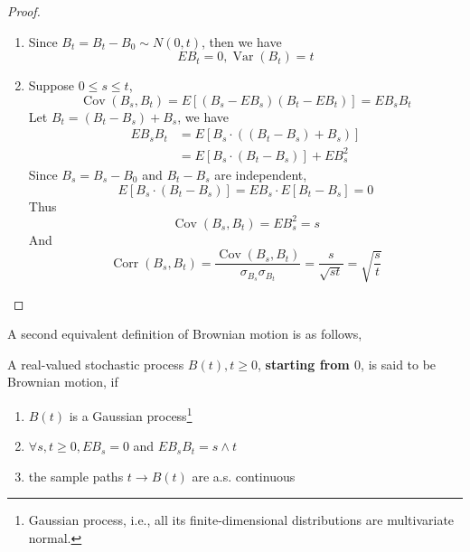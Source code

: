 \begin{proof}
	\begin{enumerate}
		\item Since $B_{t}=B_{t}-B_{0}\sim N(0, t)$, then we have
		      \begin{equation*}
			      EB_{t}=0,\operatorname{Var}\left(B_{t}\right)=t
		      \end{equation*}
		\item Suppose $0\leq s\leq t$,
		      \begin{equation*}
			      \operatorname{Cov}\left(B_{s}, B_{t}\right)=E\left[\left(B_{s}-EB_{s}\right)\left(B_{t}-EB_{t}\right)\right]=EB_{s}B_{t}
		      \end{equation*}
		      Let $B_{t}=\left(B_{t}-B_{s}\right)+B_{s}$, we have
		      \begin{equation*}
			      \begin{aligned}
				      EB_{s}B_{t} & =E\left[B_{s}\cdot\left(\left(B_{t}-B_{s}\right)+B_{s}\right)\right] \\
				                  & =E\left[B_{s}\cdot\left(B_{t}-B_{s}\right)\right]+EB_{s}^{2}
			      \end{aligned}
		      \end{equation*}
		      Since $B_{s}=B_{s}-B_{0}$ and $B_{t}-B_{s}$ are independent,
		      \begin{equation*}
			      E\left[B_{s} \cdot\left(B_{t}-B_{s}\right)\right]=EB_{s} \cdot E\left[B_{t}-B_{s}\right]=0
		      \end{equation*}
		      Thus
		      \begin{equation*}
			      \operatorname{Cov}\left(B_{s}, B_{t}\right)=EB_{s}^{2}=s
		      \end{equation*}
		      And
		      \begin{equation*}
			      \operatorname{Corr}\left(B_{s},B_{t}\right)=\frac{\operatorname{Cov}\left(B_{s},B_{t}\right)}{\sigma_{B_{s}}\sigma_{B_{t}}}=\frac{s}{\sqrt{st}}=\sqrt{\frac{s}{t}}
		      \end{equation*}
	\end{enumerate}
\end{proof}

A second equivalent definition of Brownian motion is as follows,

\begin{definition}
	A real-valued stochastic process $B(t),t\geq 0$, \textbf{starting from $0$}, is said to be Brownian motion, if
	\begin{enumerate}
		\item $B(t)$ is a Gaussian process\footnote{Gaussian process, i.e., all its finite-dimensional distributions are multivariate normal.}
		\item $\forall s,t\geq 0,EB_{s}=0$ and $EB_{s}B_{t}=s\wedge t$
		\item the sample paths $t\rightarrow B(t)$ are a.s. continuous
	\end{enumerate}
\end{definition}

